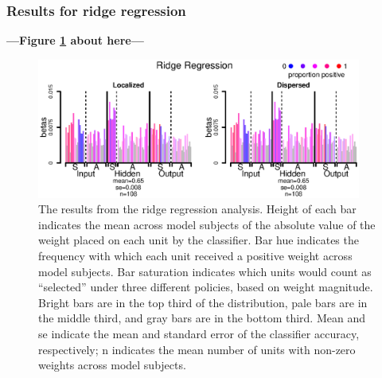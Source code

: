 \subsubsection{Results for ridge regression}

\begin{center}
\textbf{---Figure \ref{fig.ridge} about here---}
\end{center}

\begin{figure}
\centering
\includegraphics[width=0.95\textwidth]{figures/figure8.eps}
\caption{\label{fig.ridge} The results from the ridge regression analysis. Height of each bar indicates the mean across model subjects of the absolute value of the weight placed on each unit by the classifier. Bar hue indicates the frequency with which each unit received a positive weight across model subjects. Bar saturation indicates which units would count as ``selected'' under three different policies, based on weight magnitude. Bright bars are in the top third of the distribution, pale bars are in the middle third, and gray bars are in the bottom third. Mean and se indicate the mean and standard error of the classifier accuracy, respectively; n indicates the mean number of units with non-zero weights across model subjects.}
\end{figure}

